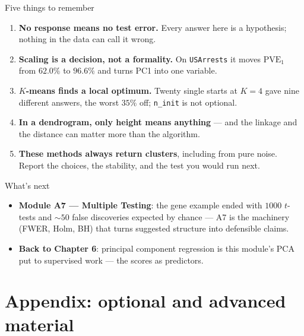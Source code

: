 \documentclass[aspectratio=169,11pt]{beamer}
\begin{document}
\begin{frame}{Five things to remember}
  \begin{takeaway}
    \begin{enumerate}
      \item \textbf{No response means no test error.} Every answer here is a hypothesis;
            nothing in the data can call it wrong.
      \item \textbf{Scaling is a decision, not a formality.} On \texttt{USArrests} it moves
            $\mathrm{PVE}_1$ from $62.0\%$ to $96.6\%$ and turns PC1 into one variable.
      \item \textbf{$K$-means finds a local optimum.} Twenty single starts at $K=4$ gave
            nine different answers, the worst $35\%$ off; \texttt{n\_init} is not optional.
      \item \textbf{In a dendrogram, only height means anything} --- and the linkage and the
            distance can matter more than the algorithm.
      \item \textbf{These methods always return clusters}, including from pure noise. Report
            the choices, the stability, and the test you would run next.
    \end{enumerate}
  \end{takeaway}
\end{frame}

\begin{frame}{What's next}
  \begin{itemize}
    \item \textbf{Module A7 --- Multiple Testing}: the gene example ended with
          $1000$ $t$-tests and $\sim 50$ false discoveries expected by chance ---
          A7 is the machinery (FWER, Holm, BH) that turns suggested structure
          into defensible claims.
    \item \textbf{Back to Chapter 6}: principal component regression is this
          module's PCA put to supervised work --- the scores as predictors.
  \end{itemize}
\end{frame}


\appendix
\AtBeginSection[]{}
\section{Appendix: optional and advanced material}
\end{document}
